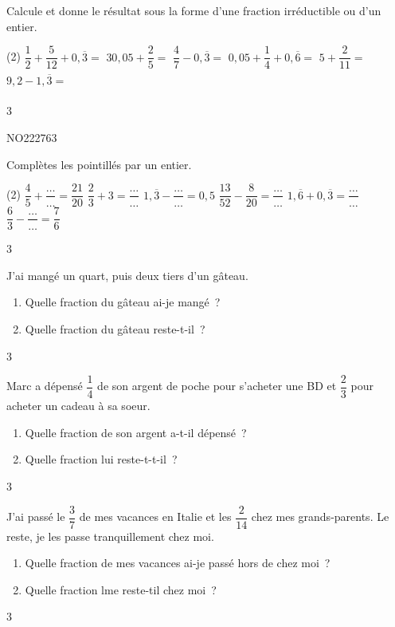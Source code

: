 \documentclass[a4paper,11pt]{report}
\begin{document}
\begin{exo}
{Calcule et donne le résultat sous la forme d'une fraction irréductible ou d'un entier.
	\begin{tasks}(2)
\task $\dfrac{1}{2}+\dfrac{5}{12}+0,\overline{3}=$
\task $30,05+\dfrac{2}{5}=$
\task $\dfrac{4}{7}-0,\overline{3}=$
\task $0,05+\dfrac{1}{4}+0,\overline{6}=$
\task $5+\dfrac{2}{11}=$
\task $9,2-1,\overline{3}=\phantom{\dfrac{1}{5}}$
\end{tasks}}
{3}
\end{exo}

\begin{exof}{NO222}{76}{3}
\end{exof}
\begin{exo}
{Complètes les pointillés par un entier.

\begin{tasks}(2)
\task  $\dfrac{4}{5}+\dfrac{\ldots}{\ldots}=\dfrac{21}{20}$
\task $\dfrac{2}{3}+3=\dfrac{\ldots}{\ldots}$
\task $1,\overline{3}-\dfrac{\ldots}{\ldots}=0,5$
\task  $\dfrac{13}{52}-\dfrac{8}{20}=\dfrac{\ldots}{\ldots}$
\task  $1,\overline{6}+0,\overline{3}=\dfrac{\ldots}{\ldots}\phantom{\dfrac{1}{2}}$
\task $\dfrac{6}{3}-\dfrac{\ldots}{\ldots}=\dfrac{7}{6}$
\end{tasks}
}
{3}
\end{exo}

\begin{exo}
{J'ai mangé un quart, puis deux tiers d'un gâteau. 
\begin{enumerate}
    \item Quelle fraction du gâteau ai-je mangé~?
    \item Quelle fraction du gâteau reste-t-il~?
\end{enumerate}}
{3}
\end{exo}


\begin{exo}
{Marc a dépensé $\dfrac{1}{4}$ de son argent de poche pour s'acheter une BD et $\dfrac{2}{3}$ pour acheter un cadeau à sa soeur.


\begin{enumerate}
    \item Quelle fraction de son argent a-t-il dépensé~?
    \item Quelle fraction lui reste-t-t-il~?
\end{enumerate}}
{3}
\end{exo}

\begin{exo}
{J'ai passé le $\dfrac{3}{7}$ de mes vacances en Italie et les $\dfrac{2}{14}$ chez mes grands-parents. Le reste, je les passe tranquillement chez moi.

\begin{enumerate}
    \item Quelle fraction de mes vacances ai-je passé hors de chez moi~?
    \item Quelle fraction lme reste-til chez moi~?
\end{enumerate}}
{3}
\end{exo}
\end{document}
